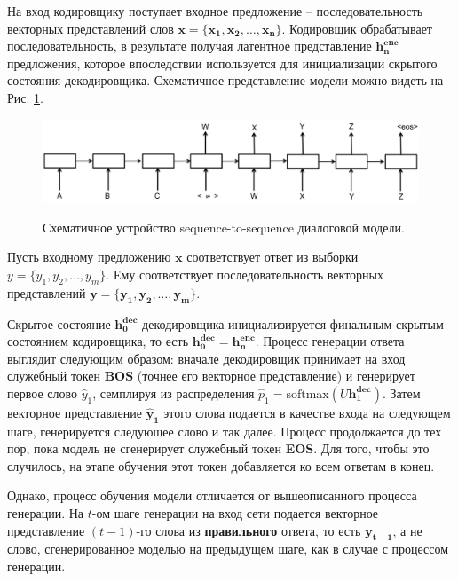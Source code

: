 \documentclass[12pt,a4paper]{amsart}
\begin{document}
На вход кодировщику поступает входное предложение -- последовательность векторных представлений слов $\mathbf{x} = \lbrace \mathbf{x_1}, \mathbf{x_2}, \dots, \mathbf{x_n}\rbrace$. Кодировщик обрабатывает последовательность, в результате получая латентное представление $\mathbf{h^{\text{enc}}_n}$ предложения, которое впоследствии используется для инициализации скрытого состояния декодировщика. Схематичное представление модели можно видеть на Рис. \ref{fig:seq2seq-basic}.

\begin{figure}[htbp!]
	\caption{Схематичное устройство sequence-to-sequence диалоговой модели.}
	\includegraphics[width=\textwidth]{imgs/basic_seq2seq.png}
	\label{fig:seq2seq-basic}
	\centering
\end{figure}


Пусть входному предложению $\mathbf{x}$ соответствует ответ из выборки $y = \lbrace y_1, y_2, \dots, y_m\rbrace$. Ему соответствует последовательность векторных представлений $\mathbf{y} = \lbrace \mathbf{y_1}, \mathbf{y_2}, \dots, \mathbf{y_m} \rbrace$.

Скрытое состояние $\mathbf{h^{\text{dec}}_0}$ декодировщика инициализируется финальным скрытым состоянием кодировщика, то есть $\mathbf{h^{\text{dec}}_0} = \mathbf{h^{\text{enc}}_n}$.
Процесс генерации ответа выглядит следующим образом: вначале декодировщик принимает на вход служебный токен $\textbf{BOS}$ (точнее его векторное представление) и генерирует первое слово $\hat{y}_1$, семплируя из распределения $\hat{p}_1 = \text{softmax}(U\mathbf{h^{\text{dec}}_1})$. Затем векторное представление $\mathbf{\hat{y}_1}$ этого слова подается в качестве входа на следующем шаге, генерируется следующее слово и так далее. Процесс продолжается до тех пор, пока модель не сгенерирует служебный токен \textbf{EOS}. Для того, чтобы это случилось, на этапе обучения этот токен добавляется ко всем ответам в конец.

Однако, процесс обучения модели отличается от вышеописанного процесса генерации. На $t$-ом шаге генерации на вход сети подается векторное представление $(t-1)$-го слова из \textbf{правильного} ответа, то есть $\mathbf{y_{t-1}}$, а не слово, сгенерированное моделью на предыдущем шаге, как в случае с процессом генерации.
\end{document}
